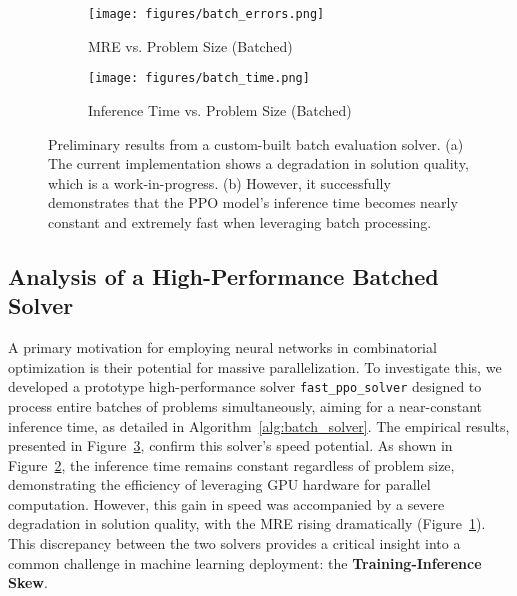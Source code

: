 \begin{figure}[H]
    \centering
    \begin{subfigure}[b]{0.7\textwidth}
        \centering
        \texttt{[image: figures/batch\_errors.png]}
        \caption{MRE vs. Problem Size (Batched)}
        \label{fig:batch_mre}
    \end{subfigure}
    
    \vspace{1em} 
    
    \begin{subfigure}[b]{0.7\textwidth}
        \centering
        \texttt{[image: figures/batch\_time.png]}
        \caption{Inference Time vs. Problem Size (Batched)}
        \label{fig:batch_time}
    \end{subfigure}
    
    \caption{Preliminary results from a custom-built batch evaluation solver. (a) The current implementation shows a degradation in solution quality, which is a work-in-progress.
(b) However, it successfully demonstrates that the PPO model's inference time becomes nearly constant and extremely fast when leveraging batch processing.}
    \label{fig:batch_solver_results}
\end{figure}

\subsection{Analysis of a High-Performance Batched Solver}
\label{sec:analysis_batch_solver}

A primary motivation for employing neural networks in combinatorial optimization is their potential for massive parallelization.
To investigate this, we developed a prototype high-performance solver \texttt{fast\_ppo\_solver} designed to process entire batches of problems simultaneously, aiming for a near-constant inference time, as detailed in Algorithm~\ref{alg:batch_solver}.
The empirical results, presented in Figure~\ref{fig:batch_solver_results}, confirm this solver's speed potential.
As shown in Figure~\ref{fig:batch_time}, the inference time remains constant regardless of problem size, demonstrating the efficiency of leveraging GPU hardware for parallel computation.
However, this gain in speed was accompanied by a severe degradation in solution quality, with the MRE rising dramatically (Figure~\ref{fig:batch_mre}).
This discrepancy between the two solvers provides a critical insight into a common challenge in machine learning deployment: the \textbf{Training-Inference Skew}.

